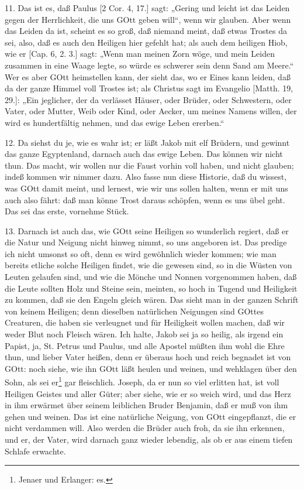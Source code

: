 11. Das ist es, daß Paulus [2 Cor. 4, 17.] sagt: „Gering und leicht ist das Leiden gegen der Herrlichkeit, die uns GOtt geben will“, wenn wir glauben. Aber wenn das Leiden da ist, scheint es so groß, daß niemand meint, daß etwas Trostes da sei, also, daß es auch den Heiligen hier gefehlt hat; als auch dem heiligen Hiob, wie er [Cap. 6, 2. 3.] sagt: „Wenn man meinen Zorn wöge, und mein Leiden zusammen in eine Waage legte, so würde es schwerer sein denn Sand am Meere.“ Wer es aber GOtt heimstellen kann, der sieht das, wo er Eines kann leiden, daß da der ganze Himmel voll Trostes ist; als Christus sagt im Evangelio [Matth. 19, 29.]: „Ein jeglicher, der da verlässet Häuser, oder Brüder, oder Schwestern, oder Vater, oder Mutter, Weib oder Kind, oder Aecker, um meines Namens willen, der wird es hundertfältig nehmen, und das ewige Leben ererben.“

12. Da siehst du je, wie es wahr ist; er läßt Jakob mit elf Brüdern, und gewinnt das ganze Egyptenland, darnach auch das ewige Leben. Das können wir nicht thun. Das macht, wir wollen nur die Faust vorhin voll haben, und nicht glauben; indeß kommen wir nimmer dazu. Also fasse nun diese Historie, daß du wissest, was GOtt damit meint, und lernest, wie wir uns sollen halten, wenn er mit uns auch also fährt: daß man könne Trost daraus schöpfen, wenn es uns übel geht. Das sei das erste, vornehme Stück.

13. Darnach ist auch das, wie GOtt seine Heiligen so wunderlich regiert, daß er die Natur und Neigung nicht hinweg nimmt, so uns angeboren ist. Das predige ich nicht umsonst so oft, denn es wird gewöhnlich wieder kommen; wie man bereits etliche solche Heiligen findet, wie die gewesen sind, so in die Wüsten von Leuten gelaufen sind, und wie die Mönche und Nonnen vorgenommen haben, daß die Leute sollten Holz und Steine sein, meinten, so hoch in Tugend und Heiligkeit zu kommen, daß sie
den Engeln gleich wären. Das sieht man in der ganzen Schrift von keinem Heiligen; denn dieselben natürlichen Neigungen sind GOttes Creaturen, die haben sie verleugnet und für Heiligkeit wollen machen, daß wir weder Blut noch Fleisch wären. Ich halte, Jakob sei ja so heilig, als irgend ein Papist, ja, St. Petrus und Paulus, und alle Apostel müßten ihm wohl die Ehre thun, und lieber Vater heißen, denn er überaus hoch und reich begnadet ist von GOtt: noch siehe, wie ihn GOtt läßt heulen und weinen, und wehklagen über den Sohn, als sei er\footnote{Jenaer und Erlanger: es.} gar fleischlich. Joseph, da er nun so viel erlitten hat, ist voll Heiligen Geistes und aller Güter; aber siehe, wie er so weich wird, und das Herz in ihm erwärmet über seinem leiblichen Bruder Benjamin, daß er muß von ihm gehen und weinen. Das ist eine natürliche Neigung, von GOtt eingepflanzt, die er nicht verdammen will. Also werden die Brüder auch froh, da sie ihn erkennen, und er, der Vater, wird darnach ganz wieder lebendig, als ob er aus einem tiefen Schlafe erwachte.

